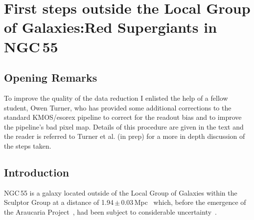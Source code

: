 \cleardoublepage
\chapter{First steps outside the Local Group of Galaxies:Red Supergiants in NGC\,55}
\label{ch:ngc55}





\section{Opening Remarks} %
\label{sec:ngc55open}

To improve the quality of the data reduction I enlisted the help of a fellow student, Owen Turner, who has provided some additional corrections to the standard KMOS/esorex pipeline to correct for the readout bias and to improve the pipeline's bad pixel map.
Details of this procedure are given in the text and the reader is referred to Turner et al. (in prep) for a more in depth discussion of the steps taken.

\section{Introduction} %
\label{sec:ngc55intro}

NGC\,55 is a galaxy located outside of the Local Group of Galaxies within the Sculptor Group at a distance of 1.94\,$\pm$\,0.03\,Mpc~\citep{2006AJ....132.2556P,2008ApJ...672..266G} which, before the emergence of the Araucaria Project~\citep{2005Msngr.121...23G}, had been subject to considerable uncertainty~\citep[e.g.][]{1987ApJ...323...79P,2006A&A...455..891V}.


